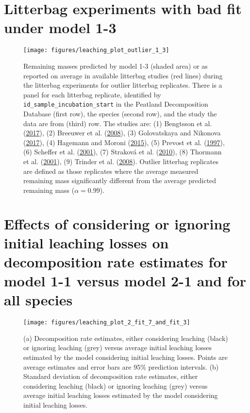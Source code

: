 \documentclass[
  12pt,
]{article}
\begin{document}
\hypertarget{sup-9}{%
\section{Litterbag experiments with bad fit under model 1-3}\label{sup-9}}



\begin{figure}[H]

{\centering \texttt{[image: figures/leaching\_plot\_outlier\_1\_3]} 

}

\caption{Remaining masses predicted by model 1-3 (shaded area) or as reported on average in available litterbag studies (red lines) during the litterbag experiments for outlier litterbag replicates. There is a panel for each litterbag replicate, identified by \texttt{id\_sample\_incubation\_start} in the Peatland Decomposition Database (first row), the species (second row), and the study the data are from (third) row. The studies are: (1) Bengtsson et al. (\protect\hyperlink{ref-Bengtsson.2017}{2017}), (2) Breeuwer et al. (\protect\hyperlink{ref-Breeuwer.2008}{2008}), (3) Golovatskaya and Nikonova (\protect\hyperlink{ref-Golovatskaya.2017}{2017}), (4) Hagemann and Moroni (\protect\hyperlink{ref-Hagemann.2015}{2015}), (5) Prevost et al. (\protect\hyperlink{ref-Prevost.1997}{1997}), (6) Scheffer et al. (\protect\hyperlink{ref-Scheffer.2001}{2001}), (7) Straková et al. (\protect\hyperlink{ref-Strakova.2010}{2010}), (8) Thormann et al. (\protect\hyperlink{ref-Thormann.2001}{2001}), (9) Trinder et al. (\protect\hyperlink{ref-Trinder.2008}{2008}). Outlier litterbag replicates are defined as those replicates where the average measured remaining mass significantly different from the average predicted remaining mass (\(\alpha = 0.99\)).}\label{fig:sup-out-sdm-mm36-1-outlier-decomposition-trajectory-p1}
\end{figure}

\hypertarget{sup-10}{%
\section{Effects of considering or ignoring initial leaching losses on decomposition rate estimates for model 1-1 versus model 2-1 and for all species}\label{sup-10}}



\begin{figure}[H]

{\centering \texttt{[image: figures/leaching\_plot\_2\_fit\_7\_and\_fit\_3]} 

}

\caption{(a) Decomposition rate estimates, either considering leaching (black) or ignoring leaching (grey) versus average initial leaching losses estimated by the model considering initial leaching losses. Points are average estimates and error bars are 95\% prediction intervals. (b) Standard deviation of decomposition rate estimates, either considering leaching (black) or ignoring leaching (grey) versus average initial leaching losses estimated by the model considering initial leaching losses.}\label{fig:sup-out-mm27-1-mm28-1-p3}
\end{figure}
\end{document}
